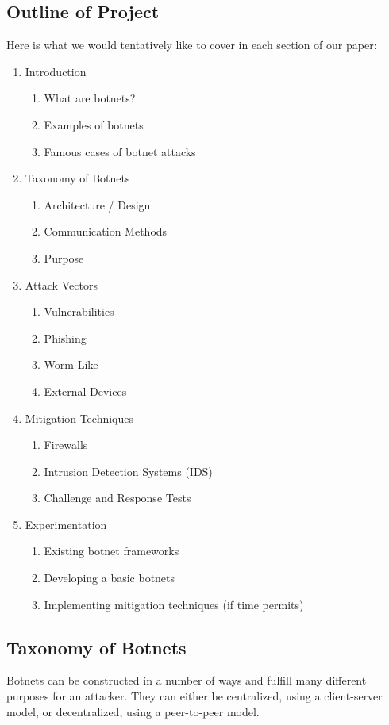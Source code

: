 \documentclass[english,12pt]{article}
\begin{document}
\subsection*{Outline of Project}
Here is what we would tentatively like to cover in each section of our paper:
\begin{enumerate}[\bf (a.)]
    \item Introduction
    \begin{enumerate}[(a.)]
        \item What are botnets?
        \item Examples of botnets
        \item Famous cases of botnet attacks
    \end{enumerate}
    \item Taxonomy of Botnets
    \begin{enumerate}[\bf (a.)]
        \item Architecture / Design
        \item Communication Methods
        \item Purpose
    \end{enumerate}
    \item Attack Vectors
    \begin{enumerate}[(a.)]
        \item Vulnerabilities
        \item Phishing
        \item Worm-Like
        \item External Devices
    \end{enumerate}
    \item Mitigation Techniques
    \begin{enumerate}[(a.)]
        \item Firewalls
        \item Intrusion Detection Systems (IDS)
        \item Challenge and Response Tests
    \end{enumerate}
    \item Experimentation
    \begin{enumerate}
        \item Existing botnet frameworks
        \item Developing a basic botnets
        \item Implementing mitigation techniques (if time permits)
    \end{enumerate}
\end{enumerate}
\subsection*{Taxonomy of Botnets}
Botnets can be constructed in a number of 
ways and fulfill many different purposes for an attacker. 
They can either be centralized, using a client-server model, or decentralized, 
using a peer-to-peer model. 
\end{document}
